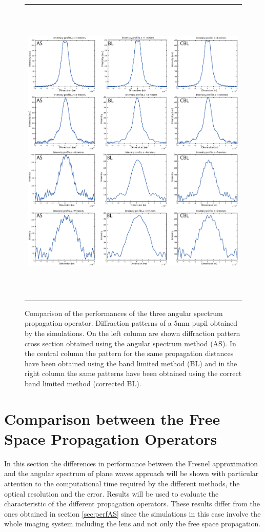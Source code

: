  \begin{figure}[H]
 	\begin{center}
 		\begin{tabular}{c}
 			\includegraphics[height=15cm]{methods1.eps}
 		\end{tabular}
 	\end{center}
 	\caption{ \label{fig:methods} 
 		Comparison of the performances of the three angular spectrum propagation operator. Diffraction patterns of a 5mm pupil obtained by the simulations. On the left column are shown diffraction pattern cross section obtained using the angular spectrum method (AS). In the central column the pattern for the same propagation distances have been obtained using the band limited method (BL) and in the right column the same patterns have been obtained using the correct band limited method (corrected BL). }
 \end{figure}
 
 \section{Comparison between the Free Space Propagation Operators}
 \label{sec:comp}
	 In this section the differences in performance between the Fresnel approximation and the angular spectrum of plane waves approach will be shown with particular attention to the computational time required by the different methods, the optical resolution and the error. Results will be used to evaluate the characteristic of the different propagation operators. These results differ from the ones obtained in section \ref{sec:perfAS} since the simulations in this case involve the whole imaging system including the lens and not only the free space propagation.

